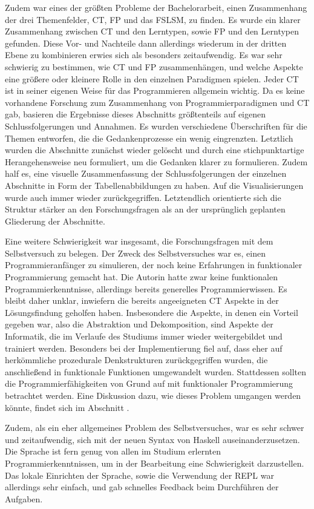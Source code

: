 Zudem war eines der größten Probleme der Bachelorarbeit, einen Zusammenhang der drei Themenfelder, CT, FP und das FSLSM, zu finden. Es wurde ein klarer Zusammenhang zwischen CT und den Lerntypen, sowie FP und den Lerntypen gefunden. Diese Vor- und Nachteile dann allerdings wiederum in der dritten Ebene zu kombinieren erwies sich als besonders zeitaufwendig.
Es war sehr schwierig zu bestimmen, wie CT und FP zusammenhängen, und welche Aspekte eine größere oder kleinere Rolle in den einzelnen Paradigmen spielen. Jeder CT ist in seiner eigenen Weise für das Programmieren allgemein wichtig.
Da es keine vorhandene Forschung zum Zusammenhang von Programmierparadigmen und CT gab, basieren die Ergebnisse dieses Abschnitts größtenteils auf eigenen Schlussfolgerungen und Annahmen.
Es wurden verschiedene Überschriften für die Themen entworfen, die die Gedankenprozesse ein wenig eingrenzten. Letztlich wurden die Abschnitte zunächst wieder gelöscht und durch eine stichpunktartige Herangehensweise neu formuliert, um die Gedanken klarer zu formulieren. Zudem half es, eine visuelle Zusammenfassung der Schlussfolgerungen der einzelnen Abschnitte in Form der Tabellenabbildungen zu haben. Auf die Visualisierungen wurde auch immer wieder zurückgegriffen.
Letztendlich orientierte sich die Struktur stärker an den Forschungsfragen als an der ursprünglich geplanten Gliederung der Abschnitte.

Eine weitere Schwierigkeit war insgesamt, die Forschungsfragen mit dem Selbstversuch zu belegen. Der Zweck des Selbstversuches war es, einen Programmieranfänger zu simulieren, der noch keine Erfahrungen in funktionaler Programmierung gemacht hat. Die Autorin hatte zwar keine funktionalen Programmierkenntnisse, allerdings bereits generelles Programmierwissen. Es bleibt daher unklar, inwiefern die bereits angeeigneten CT Aspekte in der Lösungsfindung geholfen haben. Insbesondere die Aspekte, in denen ein Vorteil gegeben war, also die Abstraktion und Dekomposition, sind Aspekte der Informatik, die im Verlaufe des Studiums immer wieder weitergebildet und trainiert werden.
Besonders bei der Implementierung fiel auf, dass eher auf herkömmliche prozedurale Denkstrukturen zurückgegriffen wurden, die anschließend in funktionale Funktionen umgewandelt wurden.
Stattdessen sollten die Programmierfähigkeiten von Grund auf mit funktionaler Programmierung betrachtet werden. Eine Diskussion dazu, wie dieses Problem umgangen werden könnte, findet sich im Abschnitt .

Zudem, als ein eher allgemeines Problem des Selbstversuches, war es sehr schwer und zeitaufwendig, sich mit der neuen Syntax von Haskell auseinanderzusetzen. Die Sprache ist fern genug von allen im Studium erlernten Programmierkenntnissen, um in der Bearbeitung eine Schwierigkeit darzustellen.
Das lokale Einrichten der Sprache, sowie die Verwendung der REPL war allerdings sehr einfach, und gab schnelles Feedback beim Durchführen der Aufgaben.

